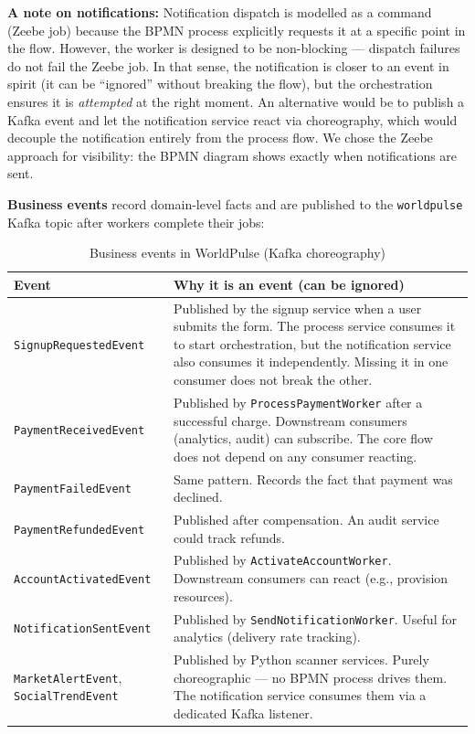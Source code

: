 \documentclass[10pt,a4paper]{article}
\begin{document}
\textbf{A note on notifications:} Notification dispatch is modelled as a command (Zeebe job) because the BPMN process explicitly requests it at a specific point in the flow. However, the worker is designed to be non-blocking --- dispatch failures do not fail the Zeebe job. In that sense, the notification is closer to an event in spirit (it can be ``ignored'' without breaking the flow), but the orchestration ensures it is \emph{attempted} at the right moment. An alternative would be to publish a Kafka event and let the notification service react via choreography, which would decouple the notification entirely from the process flow. We chose the Zeebe approach for visibility: the BPMN diagram shows exactly when notifications are sent.

\textbf{Business events} record domain-level facts and are published to the \texttt{worldpulse} Kafka topic after workers complete their jobs:

\begin{table}[H]
    \centering
    \caption{Business events in WorldPulse (Kafka choreography)}
    \small
    \begin{tabular}{
        >{\raggedright\arraybackslash}p{}
        >{\raggedright\arraybackslash}p{}
    }
    \toprule
    \textbf{Event} & \textbf{Why it is an event (can be ignored)} \\
    \midrule
    \texttt{SignupRequestedEvent} & Published by the signup service when a user submits the form. The process service consumes it to start orchestration, but the notification service also consumes it independently. Missing it in one consumer does not break the other. \\
    \addlinespace
    \texttt{PaymentReceivedEvent} & Published by \texttt{ProcessPaymentWorker} after a successful charge. Downstream consumers (analytics, audit) can subscribe. The core flow does not depend on any consumer reacting. \\
    \addlinespace
    \texttt{PaymentFailedEvent} & Same pattern. Records the fact that payment was declined. \\
    \addlinespace
    \texttt{PaymentRefundedEvent} & Published after compensation. An audit service could track refunds. \\
    \addlinespace
    \texttt{AccountActivatedEvent} & Published by \texttt{ActivateAccountWorker}. Downstream consumers can react (e.g., provision resources). \\
    \addlinespace
    \texttt{NotificationSentEvent} & Published by \texttt{SendNotificationWorker}. Useful for analytics (delivery rate tracking). \\
    \addlinespace
    \texttt{MarketAlertEvent}, \texttt{SocialTrendEvent} & Published by Python scanner services. Purely choreographic --- no BPMN process drives them. The notification service consumes them via a dedicated Kafka listener. \\
    \bottomrule
    \end{tabular}
\end{table}
\end{document}
